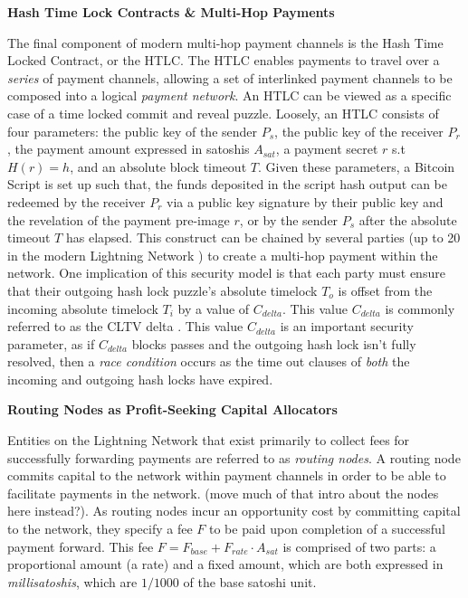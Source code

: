 \documentclass[10pt,a4paper]{article}
\theoremstyle{definition}
\begin{document}
\begin{center}
\textbf{Hash Time Lock Contracts \& Multi-Hop Payments}
\end{center}

The final component of modern multi-hop payment channels is the Hash Time
Locked Contract, or the HTLC. The HTLC enables payments to travel over a
\emph{series} of payment channels, allowing a set of interlinked payment
channels to be composed into a logical \emph{payment network}. An HTLC can be
viewed as a specific case of a time locked commit and reveal puzzle.  Loosely,
an HTLC consists of four parameters: the public key of the sender $P_{s}$, the
public key of the receiver $P_{r}$, the payment amount expressed in satoshis
$A_{sat}$, a payment secret $r$ s.t $H(r) = h$, and an absolute block timeout
$T$. Given these parameters, a Bitcoin Script is set up such that, the funds
deposited in the script hash output can be redeemed by the receiver $P_{r}$ via
a public key signature by their public key and the revelation of the payment
pre-image $r$, or by the sender $P_{s}$ after the absolute timeout $T$ has
elapsed. This construct can be chained by several parties (up to 20 in the
modern Lightning Network \cite{bolt4}) to create a multi-hop payment within the
network. One implication of this security model is that each party must ensure
that their outgoing hash lock puzzle's absolute timelock $T_o$ is offset from
the incoming absolute timelock $T_i$ by a value of $C_{delta}$. This value
$C_{delta}$ is commonly referred to as the CLTV delta \cite{bolt7}. This value
$C_{delta}$ is an important security parameter, as if $C_{delta}$ blocks passes
and the outgoing hash lock isn't fully resolved, then a \emph{race condition}
occurs as the time out clauses of \emph{both} the incoming and outgoing hash
locks have expired. \\

\begin{center}
\textbf{Routing Nodes as Profit-Seeking Capital Allocators}
\end{center}

Entities on the Lightning Network that exist primarily to collect fees for
successfully forwarding payments are referred to as \emph{routing nodes}. A
routing node commits capital to the network within payment channels in order to
be able to facilitate payments in the network. (move much of that intro about
the nodes here instead?). As routing nodes incur an opportunity cost by
committing capital to the network, they specify a fee $F$ to be paid upon
completion of a successful payment forward. This fee $F = F_{base} +
F_{rate} \cdot A_{sat}$ is comprised of two parts: a proportional amount (a
rate) and a fixed amount, which are both expressed in \emph{millisatoshis},
which are $1/1000$ of the base satoshi unit.
\end{document}
